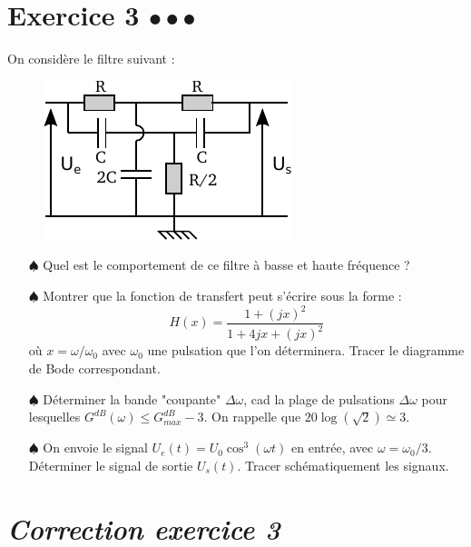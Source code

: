 \documentclass{report}
\begin{document}
 \newpage

\section*{Exercice 3 $\bullet\bullet\bullet$}

On considère le filtre suivant :

\begin{figure}[!h]
\centering
\includegraphics[width=0.5\linewidth]{circuit_2.pdf}
\end{figure}

\begin{itemize}

	\item[$\spadesuit$] Quel est le comportement de ce filtre à basse et haute fréquence ? 
	
	\item[$\spadesuit$] Montrer que la fonction de transfert peut s'écrire sous la forme :
	\begin{equation}
		H(x) =\frac{1+(jx)^2}{1+4jx + (jx)^2}
	\end{equation}
	où $x=\omega/\omega_0$ avec $\omega_0$ une pulsation que l'on déterminera. Tracer le diagramme de Bode correspondant. 
	
	\item[$\spadesuit$] Déterminer la bande "coupante" $\Delta\omega$, cad la plage de pulsations $\Delta\omega$ pour lesquelles $G^{dB}(\omega)\leq G^{dB}_{max} - 3$. On rappelle que $20\log\left( \sqrt{2}\right)\simeq3 $.
	
	\item[$\spadesuit$] On envoie le signal $U_e(t)=U_0\cos^3(\omega t)$ en entrée, avec $\omega=\omega_0/3$. Déterminer le signal de sortie $U_s(t)$. Tracer schématiquement les signaux.

\end{itemize}

\newpage

\section*{\textit{Correction exercice 3}}
\end{document}
